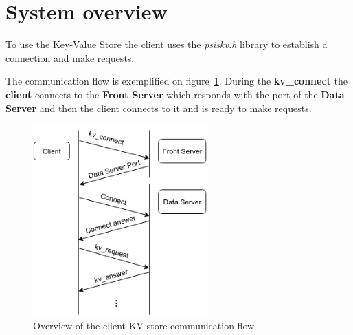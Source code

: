 \documentclass[12pt]{article} %
\begin{document}

\section{System overview}
\label{sec:Systemoverview}

To use the Key-Value Store the client uses the \emph{psiskv.h} library to establish a connection and make requests.

The communication flow is exemplified on figure~\ref{fig:Comms}. During the \textbf{kv\_connect} the \textbf{client} connects to the \textbf{Front Server} which responds with the port of the \textbf{Data Server} and then the client connects to it and is ready to make requests.

\begin{figure}[H]
\centering
\includegraphics[width=0.6\textwidth]{./Pictures/CommunicationFlow.png}
\caption{Overview of the client KV store communication flow}\label{fig:Comms}
\end{figure}
\end{document}
